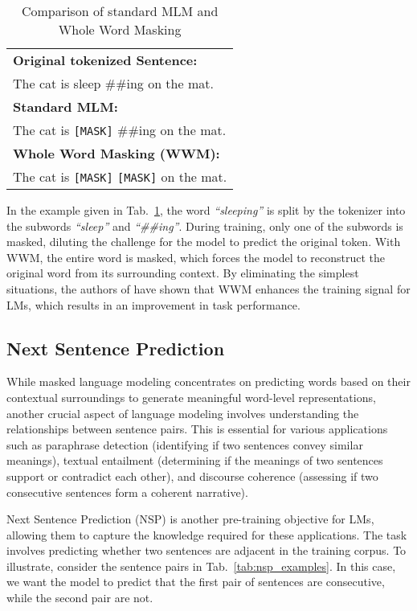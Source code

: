 \begin{table}[htb]
    \centering
    \begin{tabular}{p{}}
        \toprule
        \textbf{Original tokenized Sentence:} \\
        The cat is sleep \#\#ing on the mat. \\
        \midrule
        \textbf{Standard MLM:} \\
        The cat is \texttt{[MASK]} \#\#ing on the mat. \\
        \midrule
        \textbf{Whole Word Masking (WWM):} \\
        The cat is \texttt{[MASK]} \texttt{[MASK]} on the mat. \\
        \bottomrule
    \end{tabular}
    \caption{Comparison of standard MLM and Whole Word Masking}
    \label{tab:wwm_example}
\end{table}

In the example given in Tab.~\ref{tab:wwm_example}, the word
\textit{``sleeping''} is split by the tokenizer into the subwords
\textit{``sleep''} and \textit{``\#\#ing''}. During training, only one of the
subwords is masked, diluting the challenge for the model to predict the original
token. With WWM, the entire word is masked, which forces the model to
reconstruct the original word from its surrounding context. By eliminating the
simplest situations, the authors of \cite{chan2020german} have shown that WWM
enhances the training signal for LMs, which results in an improvement in task
performance.

\subsection{Next Sentence Prediction}

While masked language modeling concentrates on predicting words based on their
contextual surroundings to generate meaningful word-level representations,
another crucial aspect of language modeling involves understanding the
relationships between sentence pairs. This is essential for various applications
such as paraphrase detection (identifying if two sentences convey similar
meanings), textual entailment (determining if the meanings of two sentences
support or contradict each other), and discourse coherence (assessing if two
consecutive sentences form a coherent narrative).

Next Sentence Prediction (NSP) is another pre-training objective for LMs,
allowing them to capture the knowledge required for these applications. The task
involves predicting whether two sentences are adjacent in the training corpus.
To illustrate, consider the sentence pairs in Tab.~\ref{tab:nsp_examples}. In
this case, we want the model to predict that the first pair of sentences are
consecutive, while the second pair are not.

